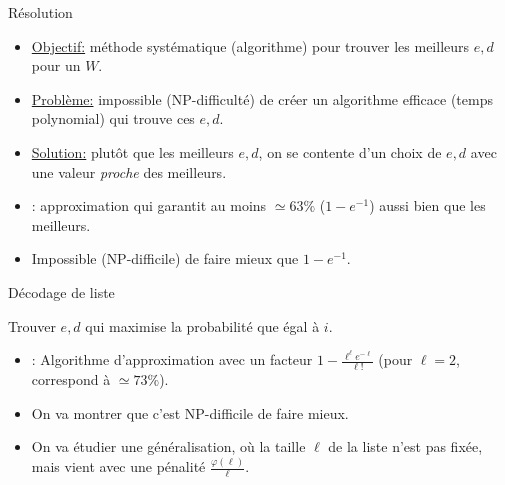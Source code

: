 \documentclass{beamer}
\theoremstyle{definition}
\theoremstyle{remark}
\begin{document}
\begin{frame}{Résolution \cite{BF18}}
  \begin{itemize}
  \item \underline{Objectif:} méthode systématique (algorithme) pour trouver les meilleurs $e,d$ pour un $W$.
    \pause
  \item \underline{Problème:} impossible (\textrm{NP}-difficulté) de créer un algorithme efficace (temps polynomial) qui trouve ces $e,d$.
    \bigskip
    \pause
  \item \underline{Solution:} plutôt que les meilleurs $e,d$, on se contente d'un choix de $e,d$ avec une valeur \emph{proche} des meilleurs.
    
    \pause
    \bigskip

  \item \cite{BF18}: approximation qui garantit au moins $\simeq 63\%$ ($1-e^{-1}$) aussi bien que les meilleurs.
  \item Impossible (\textrm{NP}-difficile) de faire mieux que $1-e^{-1}$.
  \end{itemize}
\end{frame}

\begin{frame}{Décodage de liste}
  \begin{center}

    \bigskip
    Trouver $e,d$ qui maximise la probabilité que  égal à \alert{$i$}.
  \end{center}
  
  \pause\pause\pause
  
  \begin{itemize}
  \item \cite{BFGG20}: Algorithme d'approximation avec un facteur $1-\frac{\ell^{\ell}e^{-\ell}}{\ell!}$ (pour $\ell=2$, correspond à $\simeq 73\%$).
    \pause
  \item On va montrer que c'est \textrm{NP}-difficile de faire mieux.
    \pause
  \item On va étudier une généralisation, où la taille $\ell$ de la liste n'est pas fixée, mais vient avec une pénalité $\frac{\varphi(\ell)}{\ell}$.
  \end{itemize}
\end{frame}
\end{document}
